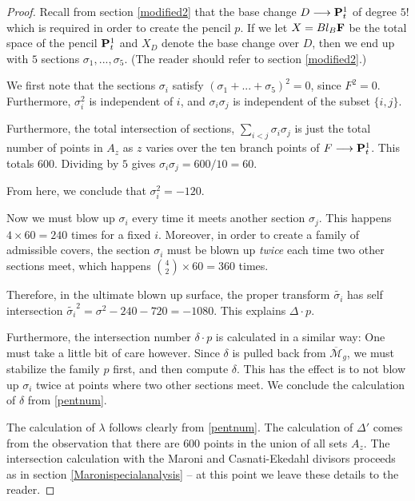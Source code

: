 \documentclass[reqno, 10 pt]{article}
\theoremstyle{definition}
\theoremstyle{remark}
\numberwithin{equation}{section}
\numberwithin{thm}{section}
\numberwithin{prop}{section}
\numberwithin{lem}{section}
\numberwithin{cor}{section}
\numberwithin{conj}{section}
\numberwithin{defn}{section}
\newcommand{\td}{\widetilde}
\newcommand{\F}{{\mathbf F}}
\renewcommand{\to}{\longrightarrow}
\newcommand{\Mg}{{\overline{\mathcal{M}}_{g}}}
\renewcommand{\P}{{\bf P}}
\renewcommand{\F}{{\bf F}}
\begin{document}
\begin{proof}
Recall from section \ref{modified2} that the base change $D \to \P^{1}_{t}$ of degree $5!$ which is required in order to create the pencil $p$. If we let $X = Bl_{B}\F$ be the total space of the pencil $\P^{1}_{t}$ and $X_{D}$ denote the base change over $D$, then we end up with $5$ sections $\sigma_{1}, ... ,\sigma_{5}$.  (The reader should refer to section \ref{modified2}.) 

We first note that the sections $\sigma_{i}$ satisfy $(\sigma_{1} + ... + \sigma_{5})^{2} = 0$, since $F^{2}=0$.  Furthermore, $\sigma_{i}^{2}$  is independent of $i$, and $\sigma_{i}\sigma_{j}$ is independent of the subset $\{i,j\}$.

Furthermore, the total intersection of sections, $\sum_{i<j}\sigma_{i}\sigma_{j}$ is just the total number of points in $A_{z}$ as $z$ varies over the ten branch points of $F \to \P^{1}_{t}$.  This totals $600$.  Dividing by $5$ gives $\sigma_{i} \sigma_{j} = 600/10 = 60.$

From here, we conclude that $\sigma_{i}^{2} = -120.$ 

Now we must blow up $\sigma_{i}$ every time it meets another section $\sigma_{j}$.  This happens $4 \times 60 = 240$ times for a fixed $i$. Moreover, in order to create a family of admissible covers, the section $\sigma_{i}$ must be blown up {\sl twice} each time  two other sections meet, which happens ${4 \choose 2} \times 60 = 360$ times.  

Therefore, in the ultimate blown up surface, the proper transform $\td{\sigma_{i}}$ has self intersection  $\td{\sigma_{i}}^{2} = \sigma^{2} - 240 - 720 = -1080.$  This explains $\Delta \cdot p$.

Furthermore, the intersection number $\delta \cdot p$ is calculated in a similar way:  One must take a little bit of care however. Since $\delta$ is pulled back from $\Mg$, we must stabilize the family $p$ first, and then compute $\delta$.  This has the effect is to not blow up $\sigma_{i}$ twice at points where two other sections meet.  We conclude the calculation of $\delta$ from \autoref{pentnum}.

The calculation of $\lambda$ follows clearly from \autoref{pentnum}.  The calculation of $\Delta'$ comes from the observation that there are $600$ points in the union of all sets $A_{z}$.  The intersection calculation with the Maroni and Casnati-Ekedahl divisors proceeds as in section \ref{Maronispecialanalysis} -- at this point we leave these details to the reader.
\end{proof}
\end{document}
